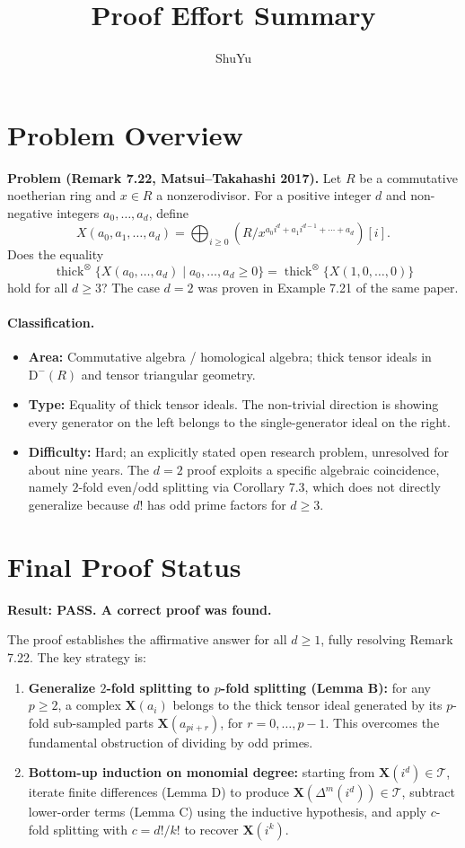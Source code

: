 \documentclass[11pt]{article}
\title{Proof Effort Summary}
\author{ShuYu}
\date{}
\newcommand{\Db}{\mathrm{D}^{-}(R)}
\newcommand{\XX}{\mathbf{X}}
\newcommand{\TT}{\mathcal{T}}
\newcommand{\thicktensor}[1]{\operatorname{thick}^{\otimes}\{#1\}}
\begin{document}
\maketitle

\section{Problem Overview}

\noindent\textbf{Problem (Remark 7.22, Matsui--Takahashi 2017).}
Let $R$ be a commutative noetherian ring and $x \in R$ a nonzerodivisor. For a positive integer $d$ and non-negative integers $a_0,\ldots,a_d$, define
\[
X(a_0,a_1,\ldots,a_d)
=
\bigoplus_{i \geqslant 0}\left(R/x^{a_0 i^d + a_1 i^{d-1} + \cdots + a_d}\right)[i].
\]
Does the equality
\[
\thicktensor{X(a_0,\ldots,a_d)\mid a_0,\ldots,a_d \geqslant 0}
=
\thicktensor{X(1,0,\ldots,0)}
\]
hold for all $d \geqslant 3$? The case $d=2$ was proven in Example 7.21 of the same paper.

\paragraph{Classification.}
\begin{itemize}
\item \textbf{Area:} Commutative algebra / homological algebra; thick tensor ideals in $\Db$ and tensor triangular geometry.
\item \textbf{Type:} Equality of thick tensor ideals. The non-trivial direction is showing every generator on the left belongs to the single-generator ideal on the right.
\item \textbf{Difficulty:} Hard; an explicitly stated open research problem, unresolved for about nine years. The $d=2$ proof exploits a specific algebraic coincidence, namely $2$-fold even/odd splitting via Corollary 7.3, which does not directly generalize because $d!$ has odd prime factors for $d \geqslant 3$.
\end{itemize}

\section{Final Proof Status}

\noindent\textbf{Result: PASS. A correct proof was found.}

The proof establishes the affirmative answer for all $d \geqslant 1$, fully resolving Remark 7.22. The key strategy is:
\begin{enumerate}
\item \textbf{Generalize $2$-fold splitting to $p$-fold splitting (Lemma B):} for any $p \geqslant 2$, a complex $\XX(a_i)$ belongs to the thick tensor ideal generated by its $p$-fold sub-sampled parts $\XX(a_{pi+r})$, for $r=0,\ldots,p-1$. This overcomes the fundamental obstruction of dividing by odd primes.
\item \textbf{Bottom-up induction on monomial degree:} starting from $\XX(i^d)\in\TT$, iterate finite differences (Lemma D) to produce $\XX(\Delta^m(i^d))\in\TT$, subtract lower-order terms (Lemma C) using the inductive hypothesis, and apply $c$-fold splitting with $c=d!/k!$ to recover $\XX(i^k)$.
\end{enumerate}
\end{document}
